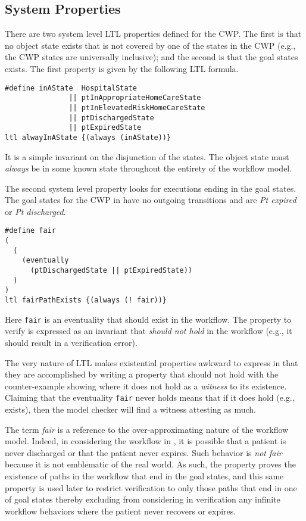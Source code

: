 \subsection{System Properties}
There are two system level LTL properties defined for the CWP. The first is that no object state exists that is not covered by one of the states in the CWP (e.g., the CWP states are universally inclusive); and the second is that the goal states exists. The first property is given by the following LTL formula.
%
{\small
\begin{lstlisting}[style=myPromela]
#define inAState  HospitalState
               || ptInAppropriateHomeCareState
               || ptInElevatedRiskHomeCareState
               || ptDischargedState
               || ptExpiredState
ltl alwayInAState {(always (inAState))}
\end{lstlisting}
}
%
\noindent It is a simple invariant on the disjunction of the states. The object state must \emph{always} be in some known state throughout the entirety of the workflow model.

The second system level property looks for executions ending in the goal states. The goal states for the CWP in  have no outgoing transitions and are \emph{Pt expired} or \emph{Pt discharged}.
%
{\small
\begin{lstlisting}[style=myPromela]
#define fair
(
  (
    (eventually 
      (ptDischargedState || ptExpiredState))
  )
)
ltl fairPathExists {(always (! fair))}
\end{lstlisting}
}
%
\noindent Here \texttt{fair} is an eventuality that should exist in the workflow. The property to verify is expressed as an invariant that \emph{should not hold} in the workflow (e.g., it should result in a verification error). 

The very nature of LTL makes existential properties awkward to express in that they are accomplished by writing a property that should not hold with the counter-example showing where it does not hold as a \emph{witness} to its existence. Claiming that the eventuality \texttt{fair} never holds means that if it does hold (e.g., exists), then the model checker will find a witness attesting as much.

The term \emph{fair} is a reference to the over-approximating nature of the workflow model. Indeed, in considering the workflow in , it is possible that a patient is never discharged or that the patient never expires. Such behavior is \emph{not fair} because it is not emblematic of the real world. As such, the property proves the existence of paths in the workflow that end in the goal states, and this same property is used later to restrict verification to only those paths that end in one of goal states thereby excluding from considering in verification any infinite workflow behaviors where the patient never recovers or expires.

